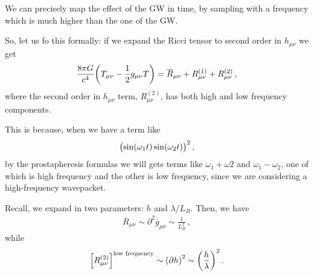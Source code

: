 \documentclass[main.tex]{subfiles}
\begin{document}



We can precisely map the effect of the GW in time, by sampling with a frequency which is much higher than the one of the GW. 

So, let us fo this formally: if we expand the Ricci tensor to second order in \(h_{\mu \nu }\) we get 
%
\begin{align}
\frac{8 \pi G}{c^{4}} \qty(T_{\mu \nu } - \frac{1}{2} g_{\mu \nu }T)
= \overline{R}_{\mu \nu } 
+ R^{(1)}_{\mu \nu } 
+ R^{(2)}_{\mu \nu } 
\,,
\end{align}
%
where the second order in \(h_{\mu \nu }\) term, \(R^{(2)}_{\mu \nu }\), has both high and low frequency components. 

This is because, when we have a term like 
%
\begin{align}
\qty(\sin(\omega_{1} t)\sin(\omega_2 t))^2
\,,
\end{align}
%
by the prostapheresis formulas we will gets terms like \(\omega_1 + \omega 2 \) and \(\omega_1 - \omega_2 \), one of which is high frequency and the other is low frequency, since we are considering a high-frequency wavepacket.

Recall, we expand in two parameters: \(h\) and \(\lambda / L_B\). Then, we have 
%
\begin{align}
\overline{R}_{\mu \nu } \sim \partial^2 \overline{g}_{\mu \nu } \sim \frac{1}{L_B^2} 
\,,
\end{align}
%
while 
%
\begin{align}
\qty[R^{(2)}_{\mu \nu }]^{\text{low frequency}} \sim \qty(\partial h)^2
 \sim \qty(\frac{h}{\lambda })^2
\,.
\end{align}
\end{document}
